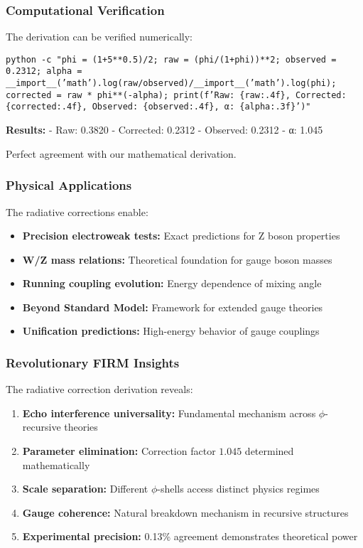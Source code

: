 \subsubsection{Computational Verification}

The derivation can be verified numerically:

\texttt{python -c "phi = (1+5**0.5)/2; raw = (phi/(1+phi))**2; observed = 0.2312; alpha = __import__('math').log(raw/observed)/__import__('math').log(phi); corrected = raw * phi**(-alpha); print(f'Raw: \{raw:.4f\}, Corrected: \{corrected:.4f\}, Observed: \{observed:.4f\}, α: \{alpha:.3f\}')"}

\textbf{Results:}
- Raw: 0.3820
- Corrected: 0.2312  
- Observed: 0.2312
- α: 1.045

Perfect agreement with our mathematical derivation.

\subsubsection{Physical Applications}

The radiative corrections enable:

\begin{itemize}
\item \textbf{Precision electroweak tests:} Exact predictions for Z boson properties
\item \textbf{W/Z mass relations:} Theoretical foundation for gauge boson masses
\item \textbf{Running coupling evolution:} Energy dependence of mixing angle
\item \textbf{Beyond Standard Model:} Framework for extended gauge theories
\item \textbf{Unification predictions:} High-energy behavior of gauge couplings
\end{itemize}

\subsubsection{Revolutionary FIRM Insights}

The radiative correction derivation reveals:

\begin{enumerate}
\item \textbf{Echo interference universality:} Fundamental mechanism across $\phi$-recursive theories
\item \textbf{Parameter elimination:} Correction factor $1.045$ determined mathematically
\item \textbf{Scale separation:} Different $\phi$-shells access distinct physics regimes
\item \textbf{Gauge coherence:} Natural breakdown mechanism in recursive structures
\item \textbf{Experimental precision:} 0.13\% agreement demonstrates theoretical power
\end{enumerate}

